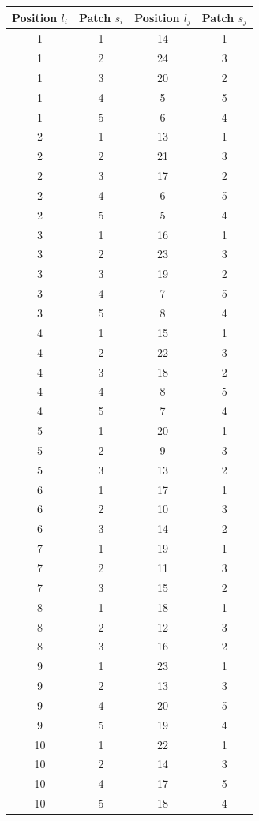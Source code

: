 \documentclass[a4paper, amsfonts, amssymb, amsmath, reprint, showkeys, nofootinbib, oneside]{revtex4-1}
\begin{document}
\begin{table}[h!]
	\begin{tabular}{ cccc } 
		\hline
		Position $l_i$ & Patch $s_i$ & Position $l_j$ & Patch $s_j$ \\
		\hline
		1 & 1 & 14 & 1 \\
		1 & 2 & 24 & 3 \\
		1 & 3 & 20 & 2 \\
		1 & 4 & 5 & 5 \\
		1 & 5 & 6 & 4 \\
		2 & 1 & 13 & 1 \\
		2 & 2 & 21 & 3 \\
		2 & 3 & 17 & 2 \\
		2 & 4 & 6 & 5 \\
		2 & 5 & 5 & 4 \\
		3 & 1 & 16 & 1 \\
		3 & 2 & 23 & 3 \\
		3 & 3 & 19 & 2 \\
		3 & 4 & 7 & 5 \\
		3 & 5 & 8 & 4 \\
		4 & 1 & 15 & 1 \\
		4 & 2 & 22 & 3 \\
		4 & 3 & 18 & 2 \\
		4 & 4 & 8 & 5 \\
		4 & 5 & 7 & 4 \\
		5 & 1 & 20 & 1 \\
		5 & 2 & 9 & 3 \\
		5 & 3 & 13 & 2 \\
		6 & 1 & 17 & 1 \\
		6 & 2 & 10 & 3 \\
		6 & 3 & 14 & 2 \\
		7 & 1 & 19 & 1 \\
		7 & 2 & 11 & 3 \\
		7 & 3 & 15 & 2 \\
		8 & 1 & 18 & 1 \\
		8 & 2 & 12 & 3 \\
		8 & 3 & 16 & 2 \\
		9 & 1 & 23 & 1 \\
		9 & 2 & 13 & 3 \\
		9 & 4 & 20 & 5 \\
		9 & 5 & 19 & 4 \\
		10 & 1 & 22 & 1 \\
		10 & 2 & 14 & 3 \\
		10 & 4 & 17 & 5 \\
		10 & 5 & 18 & 4 \\

\end{tabular}
\end{table}
\end{document}
